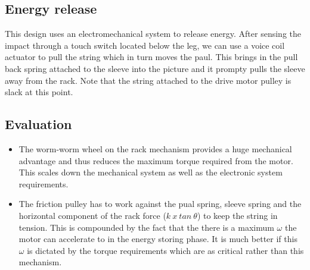 \subsection{Energy release}
This design uses an electromechanical system to release energy. After sensing the impact through a touch switch located
below the leg, we can use a voice coil actuator to pull the string which in turn moves the paul. This brings in the pull
back spring attached to the sleeve into the picture and it prompty pulls the sleeve away from the rack. Note that the string attached 
to the drive motor pulley is slack at this point.

\subsection{Evaluation}
\begin{itemize}
\item
The worm-worm wheel on the rack mechanism provides a huge mechanical advantage and thus reduces the maximum torque required from
the motor. This scales down the mechanical system as well as the electronic system requirements.
\item
The friction pulley has to work against the pual spring, sleeve spring and the horizontal component of the rack force ($k\:x\:tan\:\theta$) to keep the string in tension. This is compounded by the fact that the there is a maximum $\omega$ the motor can
accelerate to in the energy storing phase. It is much better if this $\omega$ is dictated by the torque requirements which are as
critical rather than this mechanism.
\end{itemize}





